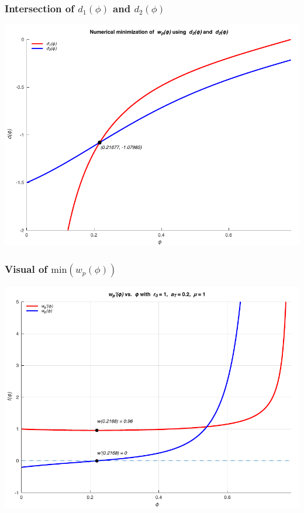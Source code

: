 \documentclass{beamer}
\begin{document}
\begin{frame}
    \frametitle{Intersection of $d_1(\phi)$ and $d_2(\phi)$}

    \begin{center}
        \includegraphics[scale=0.7]{plots/partC_min.pdf}
    \end{center}
\end{frame}

\begin{frame}
    \frametitle{Visual of $\text{min}(w_p(\phi))$}

    \begin{center}
        \includegraphics[scale=0.7]{plots/partC_r.pdf}
    \end{center}
\end{frame}
\end{document}

